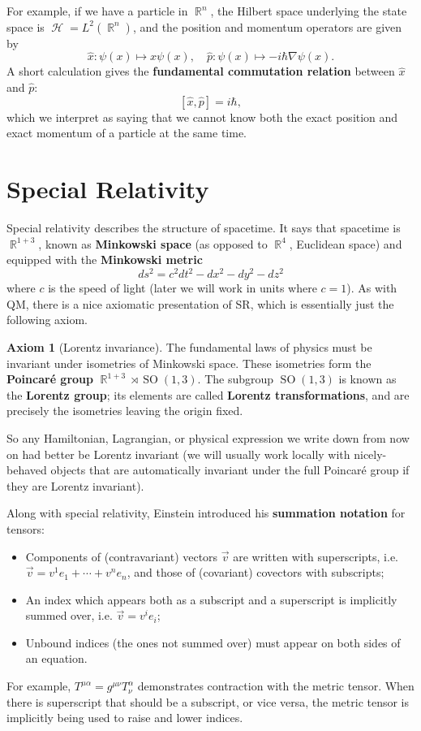 \documentclass{report}
\theoremstyle{plain}
\theoremstyle{definition}
\newtheorem{axiom}{Axiom}
\theoremstyle{remark}
\DeclareMathOperator{\bR}{\mathbb{R}}
\DeclareMathOperator{\cH}{\mathcal{H}}
\DeclareMathOperator{\SO}{SO}
\begin{document}
For example, if we have a particle in $\bR^n$, the Hilbert space
underlying the state space is $\cH = L^2(\bR^n)$, and the position and
momentum operators are given by
$$ \hat{x}: \psi(x) \mapsto x\psi(x), \quad \hat{p}: \psi(x) \mapsto -i\hbar\nabla\psi(x). $$
A short calculation gives the {\bf fundamental commutation relation}
between $\hat{x}$ and $\hat{p}$:
$$ [\hat{x}, \hat{p}] = i\hbar, $$
which we interpret as saying that we cannot know both the exact
position and exact momentum of a particle at the same time.

\section{Special Relativity}

\setcounter{axiom}{0}

Special relativity describes the structure of spacetime. It says that
spacetime is $\bR^{1+3}$, known as {\bf Minkowski space} (as opposed
to $\bR^4$, Euclidean space) and equipped with the {\bf Minkowski
  metric}
$$ ds^2 = c^2 dt^2 - dx^2 - dy^2 - dz^2 $$
where $c$ is the speed of light (later we will work in units where
$c = 1$). As with QM, there is a nice axiomatic presentation of SR,
which is essentially just the following axiom.

\begin{axiom}[Lorentz invariance]
  The fundamental laws of physics must be invariant under isometries
  of Minkowski space. These isometries form the {\bf Poincar\'e group}
  $\bR^{1+3} \rtimes \SO(1,3)$. The subgroup $\SO(1,3)$ is known as
  the {\bf Lorentz group}; its elements are called {\bf Lorentz
    transformations}, and are precisely the isometries leaving the
  origin fixed.
\end{axiom}

So any Hamiltonian, Lagrangian, or physical expression we write down
from now on had better be Lorentz invariant (we will usually work
locally with nicely-behaved objects that are automatically invariant
under the full Poincar\'e group if they are Lorentz invariant).

Along with special relativity, Einstein introduced his {\bf summation
  notation} for tensors:
\begin{itemize}
\item Components of (contravariant) vectors $\vec{v}$ are written with
  superscripts, i.e. $\vec{v} = v^1 e_1 + \cdots + v^n e_n$, and those
  of (covariant) covectors with subscripts;
\item An index which appears both as a subscript and a superscript is
  implicitly summed over, i.e. $\vec{v} = v^i e_i$;
\item Unbound indices (the ones not summed over) must appear on both
  sides of an equation.
\end{itemize}
For example, $T^{\mu \alpha} = g^{\mu \nu} T^\alpha_\nu$ demonstrates
contraction with the metric tensor. When there is superscript that
should be a subscript, or vice versa, the metric tensor is implicitly
being used to raise and lower indices.
\end{document}
